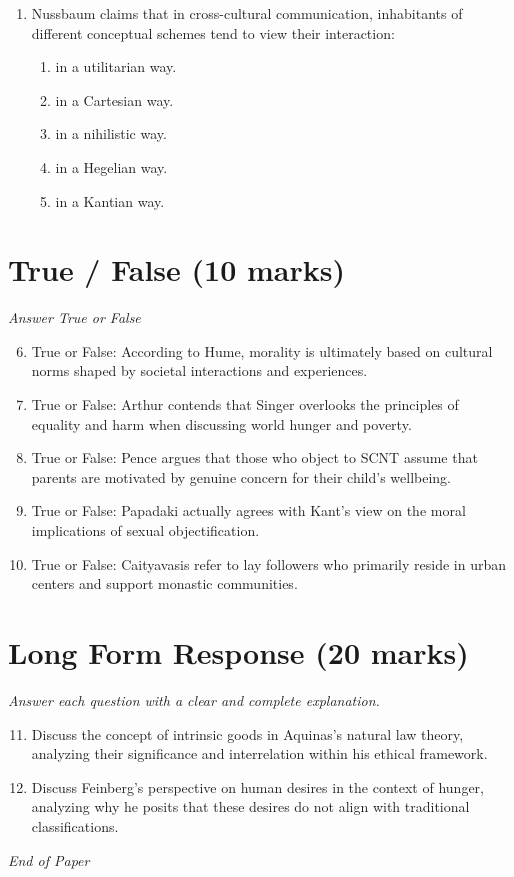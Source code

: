 \documentclass[12pt]{article}
\begin{document}
\begin{enumerate}[label=\arabic*.]
\begin{enumerate}[label=(\alph*)]
\end{enumerate}
\item Nussbaum claims that in cross-cultural communication, inhabitants of different conceptual schemes tend to view their interaction:
\begin{enumerate}[label=(\alph*)]
    \item in a utilitarian way.
    \item in a Cartesian way.
    \item in a nihilistic way.
    \item in a Hegelian way.
    \item in a Kantian way.
\end{enumerate}
\end{enumerate}

\section*{True / False (10 marks)}
\textit{Answer True or False}
\begin{enumerate}[label=\arabic*.]
\setcounter{enumi}{5}
\item True or False: According to Hume, morality is ultimately based on cultural norms shaped by societal interactions and experiences.
\item True or False: Arthur contends that Singer overlooks the principles of equality and harm when discussing world hunger and poverty.
\item True or False: Pence argues that those who object to SCNT assume that parents are motivated by genuine concern for their child's wellbeing.
\item True or False: Papadaki actually agrees with Kant's view on the moral implications of sexual objectification.
\item True or False: Caityavasis refer to lay followers who primarily reside in urban centers and support monastic communities.
\end{enumerate}

\section*{Long Form Response (20 marks)}
\textit{Answer each question with a clear and complete explanation.}
\begin{enumerate}[label=\arabic*.]
\setcounter{enumi}{10}
\item Discuss the concept of intrinsic goods in Aquinas's natural law theory, analyzing their significance and interrelation within his ethical framework.
\item Discuss Feinberg's perspective on human desires in the context of hunger, analyzing why he posits that these desires do not align with traditional classifications.
\end{enumerate}

\vfill
\noindent\textit{End of Paper}
\end{document}
